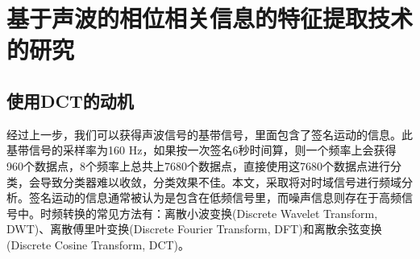 \section{基于声波的相位相关信息的特征提取技术的研究}
\subsection{使用DCT的动机}
经过上一步，我们可以获得声波信号的基带信号，里面包含了签名运动的信息。此基带信号的采样率为160 Hz，如果按一次签名6秒时间算，则一个频率上会获得960个数据点，8个频率上总共上7680个数据点，直接使用这7680个数据点进行分类，会导致分类器难以收敛，分类效果不佳。本文，采取将对时域信号进行频域分析。签名运动的信息通常被认为是包含在低频信号里，而噪声信息则存在于高频信号中。时频转换的常见方法有：离散小波变换(Discrete Wavelet Transform, DWT)、离散傅里叶变换(Discrete Fourier Transform, DFT)和离散余弦变换(Discrete Cosine Transform, DCT)。

